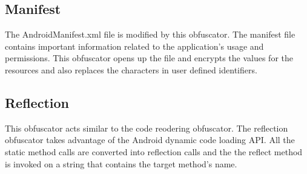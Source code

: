 \subsection{Manifest}
The AndroidManifest.xml file is modified by this obfuscator. The manifest file contains important information related to the application's usage and permissions. This obfuscator opens up the file and encrypts the values for the resources and also replaces the characters in user defined identifiers.

\subsection{Reflection}
This obfuscator acts similar to the code reodering obfuscator. The reflection obfuscator takes advantage of the Android dynamic code loading API. All the static method calls are converted into reflection calls and the the reflect method is invoked on a string that contains the target method's name.